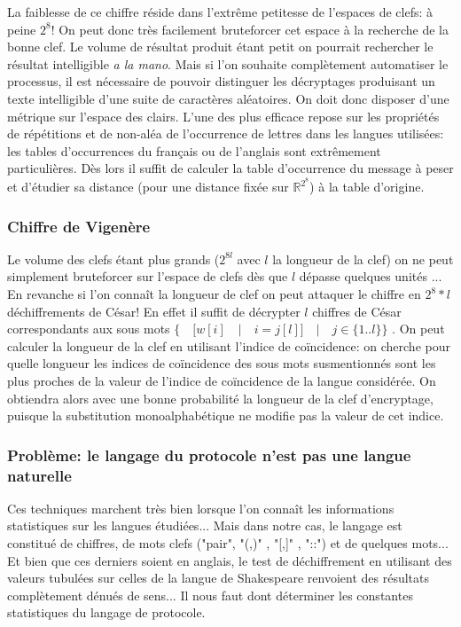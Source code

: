 \documentclass[11pt]{article} %
\begin{document}
    La faiblesse de ce chiffre réside dans l'extrême petitesse de l'espaces de clefs: à peine $2^8$! On peut donc très facilement bruteforcer cet espace à la recherche de la bonne clef. Le volume de résultat produit étant petit on pourrait rechercher le résultat intelligible \emph{a la mano}. Mais si l'on souhaite complètement automatiser le processus, il est nécessaire de pouvoir distinguer les décryptages produisant un texte intelligible d'une suite de caractères aléatoires. On doit donc disposer d'une métrique sur l'espace des clairs. L'une des plus efficace repose sur les propriétés de répétitions et de non-aléa de l'occurrence de lettres dans les langues utilisées: les tables d’occurrences du français ou de l'anglais sont extrêmement particulières. Dès lors il suffit de calculer la table d’occurrence du message à peser et d'étudier sa distance (pour une distance fixée sur $\mathbb{R}^{2^8}$) à la table d'origine.

\subsubsection{Chiffre de Vigenère}

    Le volume des clefs étant plus grands ($2^{8l}$ avec $l$ la longueur de la clef) on ne peut simplement bruteforcer sur l'espace de clefs dès que $l$ dépasse quelques unités ... En revanche si l'on connaît la longueur de clef on peut attaquer le chiffre en $2^8*l$ déchiffrements de César! En effet il suffit de décrypter $l$ chiffres de César correspondants aux sous mots 
$\{\quad [ w[i]\quad | \quad i = j [l] ] \quad | \quad j \in \{1..l\} \}$ . On peut calculer la longueur de la clef en utilisant l'indice de coïncidence: on cherche pour quelle longueur les indices de coïncidence des sous mots susmentionnés sont les plus proches de la valeur de l'indice de coïncidence de la langue considérée. On obtiendra alors avec une bonne probabilité la longueur de la clef d'encryptage, puisque la substitution monoalphabétique ne modifie pas la valeur de cet indice.

\subsubsection{Problème: le langage du protocole n'est pas une langue naturelle}

    Ces techniques marchent très bien lorsque l'on connaît les informations statistiques sur les langues étudiées... Mais dans notre cas, le langage est constitué de chiffres, de mots clefs ("pair", "(,)" , "[,]" , "::") et de quelques mots... Et bien que ces derniers soient en anglais, le test de déchiffrement en utilisant des valeurs tubulées sur celles de la langue de Shakespeare renvoient des résultats complètement dénués de sens... Il nous faut dont déterminer les constantes statistiques du langage de protocole.
\end{document}
